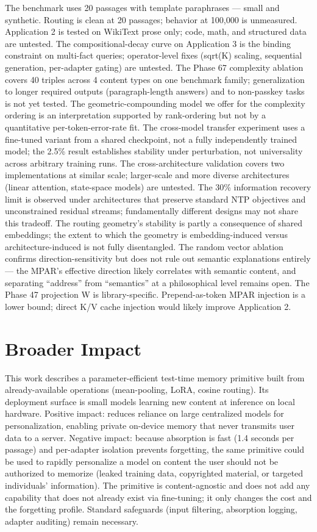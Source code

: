 The benchmark uses 20 passages with template paraphrases --- small and synthetic. Routing is clean at 20 passages; behavior at 100,000 is unmeasured. Application 2 is tested on WikiText prose only; code, math, and structured data are untested. The compositional-decay curve on Application 3 is the binding constraint on multi-fact queries; operator-level fixes (sqrt(K) scaling, sequential generation, per-adapter gating) are untested. The Phase 67 complexity ablation covers 40 triples across 4 content types on one benchmark family; generalization to longer required outputs (paragraph-length answers) and to non-passkey tasks is not yet tested. The geometric-compounding model we offer for the complexity ordering is an interpretation supported by rank-ordering but not by a quantitative per-token-error-rate fit. The cross-model transfer experiment uses a fine-tuned variant from a shared checkpoint, not a fully independently trained model; the 2.5\% result establishes stability under perturbation, not universality across arbitrary training runs. The cross-architecture validation covers two implementations at similar scale; larger-scale and more diverse architectures (linear attention, state-space models) are untested. The 30\% information recovery limit is observed under architectures that preserve standard NTP objectives and unconstrained residual streams; fundamentally different designs may not share this tradeoff. The routing geometry's stability is partly a consequence of shared embeddings; the extent to which the geometry is embedding-induced versus architecture-induced is not fully disentangled. The random vector ablation confirms direction-sensitivity but does not rule out semantic explanations entirely --- the MPAR's effective direction likely correlates with semantic content, and separating ``address'' from ``semantics'' at a philosophical level remains open. The Phase 47 projection W is library-specific. Prepend-as-token MPAR injection is a lower bound; direct K/V cache injection would likely improve Application 2.

\section{Broader Impact}\label{broader-impact}

This work describes a parameter-efficient test-time memory primitive built from already-available operations (mean-pooling, LoRA, cosine routing). Its deployment surface is small models learning new content at inference on local hardware. Positive impact: reduces reliance on large centralized models for personalization, enabling private on-device memory that never transmits user data to a server. Negative impact: because absorption is fast (1.4 seconds per passage) and per-adapter isolation prevents forgetting, the same primitive could be used to rapidly personalize a model on content the user should not be authorized to memorize (leaked training data, copyrighted material, or targeted individuals' information). The primitive is content-agnostic and does not add any capability that does not already exist via fine-tuning; it only changes the cost and the forgetting profile. Standard safeguards (input filtering, absorption logging, adapter auditing) remain necessary.

